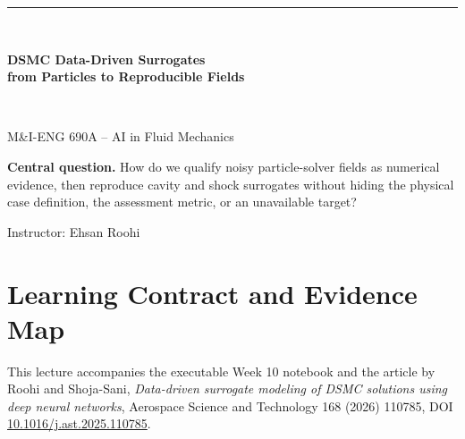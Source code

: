 \documentclass[11pt]{article}
\begin{document}
\hypersetup{pageanchor=false}
\begin{titlepage}
\centering\vspace*{0.75cm}
{\color{black}\rule{\textwidth}{2pt}}\\[0.45cm]
{\Huge\bfseries DSMC Data-Driven Surrogates\\[0.16cm]from Particles to Reproducible Fields\par}
\vspace{0.32cm}{\Large Rarefied cavity, monatomic shock, and diatomic relaxation\par}
\vspace{0.32cm}{\large Week 10 Extension Lecture Notes\par}
\vspace{0.48cm}{\color{black}\rule{\textwidth}{2pt}}\\[0.8cm]
{\Large M\&I-ENG 690A -- AI in Fluid Mechanics\par}
\vspace{0.2cm}{\large Summer 2026\par}
\vfill
\begin{tcolorbox}[colback=lightblue,colframe=blue,width=0.92\textwidth]
\textbf{Central question.} How do we qualify noisy particle-solver fields as
numerical evidence, then reproduce cavity and shock surrogates without hiding
the physical case definition, the assessment metric, or an unavailable target?
\end{tcolorbox}
\vfill{\large Instructor: Ehsan Roohi\par}
\end{titlepage}

\hypersetup{pageanchor=true}
\tableofcontents\newpage{}

\section{Learning Contract and Evidence Map}
This lecture accompanies the executable Week 10 notebook and the article by
Roohi and Shoja-Sani, \emph{Data-driven surrogate modeling of DSMC solutions
using deep neural networks}, Aerospace Science and Technology 168 (2026)
110785, DOI \href{https://doi.org/10.1016/j.ast.2025.110785}{10.1016/j.ast.2025.110785}.
\end{document}
